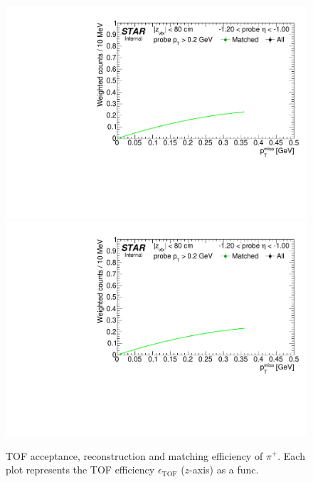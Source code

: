 \begin{figure}%
\caption[TOF acceptance, reconstruction and matching efficiency of $\pi^{+}$.]{TOF acceptance, reconstruction and matching efficiency of $\pi^{+}$. Each plot represents the TOF efficiency $\epsilon_{\text{TOF}}$ ($z$-axis) as a func.}\label{fig:tagAndProbeTofEffFits_Eta}
\centering
\parbox{0.495\textwidth}{
  \centering
  \includegraphics[width=\linewidth,page=2]{graphics/correctionsToEff/TOF_tagAndProbe/Fitting_effVsEta_data.CPT.pdf}\\
  \includegraphics[width=\linewidth,page=3]{graphics/correctionsToEff/TOF_tagAndProbe/Fitting_effVsEta_data.CPT.pdf}\\
}
\end{figure}

